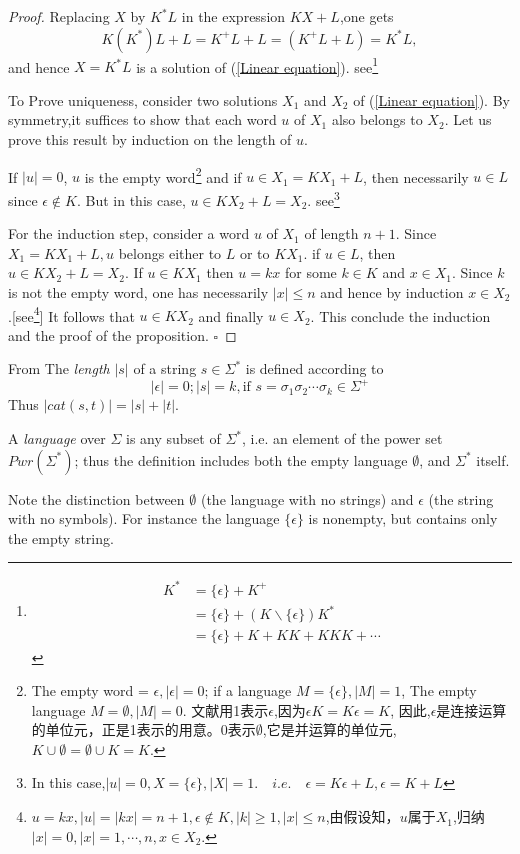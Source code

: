 \begin{proof}
	Replacing $X$ by $K^{\ast}L$ in the expression $KX+L$,one gets
	$$K(K^{\ast})L + L = K^{+}L + L = (K^{+}L + L) = K^{\ast}L,$$
	and hence $X = K^{\ast}L$ is a solution of (\ref{Linear equation}). see\footnote[1]{\begin{align*}
		K^{\ast} &= \{\epsilon\} + K^{+} \\
		&=  \{\epsilon\} + (K\backslash \{\epsilon\})K^{\ast}\\ &=\{\epsilon\} + K + KK + KKK + \cdots 
		\end{align*}}\label{star}
	
	To Prove uniqueness, consider two solutions $X_{1}$ and $X_{2}$ of (\ref{Linear equation}). By symmetry,it suffices to show that each word $u$ of $X_1$ also belongs to $X_2$. Let us prove this result by induction on the length of $u$.
	
	If $|u| = 0$, $u$ is the empty word\footnote[2]{The empty word = $\epsilon,|\epsilon| = 0$; if a language $M = \{\epsilon\}, |M| = 1$, The empty language $M = \emptyset, |M| = 0$. 文献\cite{Jean2018}用1表示$\epsilon$,因为$\epsilon K = K\epsilon = K$, 因此,$\epsilon$是连接运算的单位元，正是1表示的用意。0表示$\emptyset$,它是并运算的单位元,$K\cup \emptyset = \emptyset \cup K = K$.} and if $u \in X_1 = KX_1 + L$, then necessarily $u\in L$ since $\epsilon \notin K$. But in this case, $u\in KX_2 + L = X_2$. see\footnote[3]{In this case,$|u| = 0, X = \{\epsilon\},|X| = 1.\quad i.e.\quad\epsilon = K\epsilon + L, \epsilon = K + L$}
	
	For the induction step, consider a word $u$ of $X_1$ of length $n + 1$. Since $X_1 = KX_1 + L, u$ belongs either to $L$ or to $KX_1$. if $u\in L$, then $u\in KX_2 + L = X_2$. If $u\in KX_1$ then $u = kx$ for some $k\in K$ and $x\in X_1$. Since $k$ is not the empty word, one has necessarily $|x| \leq n$ and hence by induction $x\in X_2$.[see\footnote[4]{$u = kx,|u|=|kx|=n+1,\epsilon \notin K,|k|\ge 1,|x|\le n$,由假设知，$u$属于$X_1$,归纳$|x|=0,|x|=1,\cdots,n,x\in X_2$.}] It follows that $u\in KX_2$ and finally $u\in X_2$. This conclude the induction and the proof of the proposition.  \hfill$\square$ 
\end{proof}

\begin{svgraybox}
	
From \cite[p74]{Wonham2018} 
The \textit{length} $|s|$ of a string $s\in \Sigma^{\ast}$ is defined according to
$$|\epsilon| = 0; |s| = k, \text{if }s = \sigma_1\sigma_2 \cdots\sigma_k\in \Sigma ^{+}$$
Thus $|cat(s,t)| = |s| + |t|$.

A \textit{language} over $\Sigma$ is any subset of $\Sigma^{\ast}$, i.e. an element of the power set $Pwr(\Sigma^{\ast})$; thus the definition includes both the empty language $\emptyset$, and $\Sigma^{\ast}$ itself.

Note the distinction between $\emptyset$ (the language with no strings) and $\epsilon$ (the string with no symbols). For instance the language $\{\epsilon\}$ is nonempty, but contains only the empty string.
\end{svgraybox}	

